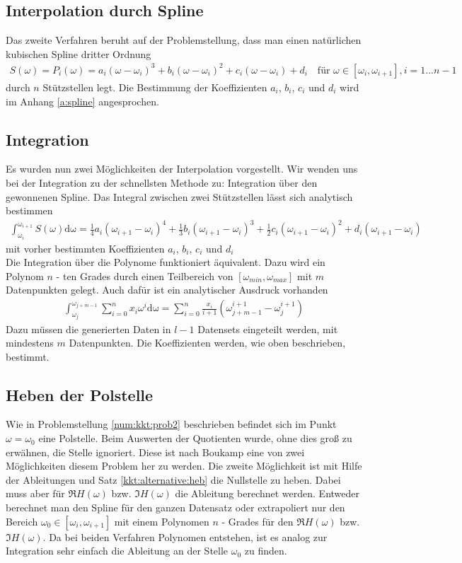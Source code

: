 \subsection{Interpolation durch Spline}
Das zweite Verfahren beruht auf der Problemstellung, dass man einen natürlichen kubischen Spline dritter Ordnung
\begin{align}
	S(\omega) = P_i(\omega) = a_i(\omega-\omega_i)^3 + b_i(\omega-\omega_i)^2 + c_i(\omega-\omega_i) +d_i \quad \text{für } \omega\in [\omega_i, \omega_{i+1}], i=1...n-1
\end{align} durch $n$ Stützstellen legt. Die Bestimmung der Koeffizienten $a_i$, $b_i$, $c_i$ und $d_i$ wird im Anhang \ref{a:spline} angesprochen.
\subsection{Integration}
Es wurden nun zwei Möglichkeiten der Interpolation vorgestellt. Wir wenden uns bei der Integration zu der schnellsten Methode zu: Integration über den gewonnenen Spline. Das Integral zwischen zwei Stützstellen lässt sich analytisch bestimmen
\begin{align}
	\int_{\omega_i}^{\omega_{i+1}} S(\omega) \mathrm{d\omega} = \frac{1}{4} a_i(\omega_{i+1}-\omega_i)^4 + \frac{1}{3} b_i(\omega_{i+1}-\omega_i)^3 + \frac{1}{2} c_i(\omega_{i+1}-\omega_i)^2 +d_i (\omega_{i+1}-\omega_i)
\end{align}
mit vorher bestimmten Koeffizienten $a_i$, $b_i$, $c_i$ und $d_i$ \\
Die Integration über die Polynome funktioniert äquivalent. Dazu wird ein Polynom $n$ - ten Grades durch einen Teilbereich von $[\omega_{min}, \omega_{max}]$ mit $m$ Datenpunkten gelegt. Auch dafür ist ein analytischer Ausdruck vorhanden
\begin{align}
	\int_{\omega_j}^{\omega_{j +m -1}} \sum_{i = 0}^{n} x_i \omega^i \mathrm{d\omega} = \sum_{i = 0}^{n} \frac{x_i}{i+1} (\omega^{i+1}_{j+m-1} - \omega_{j}^{i+1})
\end{align}
Dazu müssen die generierten Daten in $l-1$ Datensets eingeteilt werden, mit mindestens $m$ Datenpunkten. Die Koeffizienten werden, wie oben beschrieben, bestimmt. \\

\subsection{Heben der Polstelle}
Wie in Problemstellung \ref{num:kkt:prob2} beschrieben befindet sich im Punkt $\omega = \omega_0$ eine Polstelle. Beim Auswerten der Quotienten wurde, ohne dies groß zu erwähnen, die Stelle ignoriert. Diese ist nach Boukamp eine von zwei Möglichkeiten diesem Problem her zu werden. Die zweite Möglichkeit ist mit Hilfe der Ableitungen und Satz \ref{kkt:alternative:heb} die Nullstelle zu heben. Dabei muss aber für $\Re{H(\omega)}$ bzw. $\Im{H(\omega)}$ die Ableitung berechnet werden. Entweder berechnet man den Spline für den ganzen Datensatz oder extrapoliert nur den Bereich $\omega_0 \in [\omega_i, \omega_{i+1}]$ mit einem Polynomen $n$ - Grades für den $\Re{H(\omega)}$ bzw. $\Im{H(\omega)}$. Da bei beiden Verfahren Polynomen entstehen, ist es analog zur Integration sehr einfach die Ableitung an der Stelle $\omega_0$ zu finden.\cite{Boukamp1993} 
